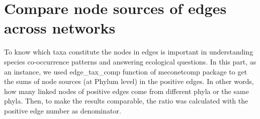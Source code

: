 \documentclass[
]{book}
\newenvironment{Shaded}{\begin{snugshade}}{\end{snugshade}}
\newcommand{\AttributeTok}[1]{\textcolor[rgb]{0.77,0.63,0.00}{#1}}
\newcommand{\CommentTok}[1]{\textcolor[rgb]{0.56,0.35,0.01}{\textit{#1}}}
\newcommand{\ConstantTok}[1]{\textcolor[rgb]{0.00,0.00,0.00}{#1}}
\newcommand{\DecValTok}[1]{\textcolor[rgb]{0.00,0.00,0.81}{#1}}
\newcommand{\FunctionTok}[1]{\textcolor[rgb]{0.00,0.00,0.00}{#1}}
\newcommand{\NormalTok}[1]{#1}
\newcommand{\OtherTok}[1]{\textcolor[rgb]{0.56,0.35,0.01}{#1}}
\newcommand{\SpecialCharTok}[1]{\textcolor[rgb]{0.00,0.00,0.00}{#1}}
\newcommand{\StringTok}[1]{\textcolor[rgb]{0.31,0.60,0.02}{#1}}
\begin{document}
\begin{Shaded}
\end{Shaded}

\hypertarget{compare-node-sources-of-edges-across-networks}{%
\section{Compare node sources of edges across networks}\label{compare-node-sources-of-edges-across-networks}}

To know which taxa constitute the nodes in edges is important in understanding species co-occurrence patterns and answering ecological questions.
In this part, as an instance, we used edge\_tax\_comp function of meconetcomp package to get the sums of node sources (at Phylum level) in the positive edges.
In other words, how many linked nodes of positive edges come from different phyla or the same phyla.
Then, to make the results comparable, the ratio was calculated with the positive edge number as denominator.
\end{document}

